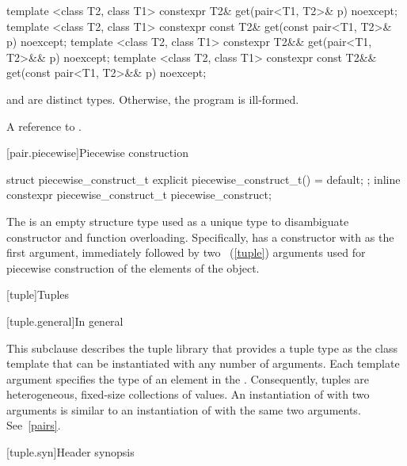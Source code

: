 %
\begin{itemdecl}
template <class T2, class T1>
  constexpr T2& get(pair<T1, T2>& p) noexcept;
template <class T2, class T1>
  constexpr const T2& get(const pair<T1, T2>& p) noexcept;
template <class T2, class T1>
  constexpr T2&& get(pair<T1, T2>&& p) noexcept;
template <class T2, class T1>
  constexpr const T2&& get(const pair<T1, T2>&& p) noexcept;
\end{itemdecl}
\begin{itemdescr}

\pnum
\requires {} and  are distinct types. Otherwise, the program is ill-formed.

\pnum
\returns A reference to .
\end{itemdescr}

[pair.piecewise]{Piecewise construction}

%
%
\begin{itemdecl}
struct piecewise_construct_t {
  explicit piecewise_construct_t() = default;
};
inline constexpr piecewise_construct_t piecewise_construct{};
\end{itemdecl}

\pnum
The   is an empty structure type
used as a unique type to disambiguate constructor and function overloading. Specifically,
 has a constructor with  as the
first argument, immediately followed by two ~(\ref{tuple}) arguments used
for piecewise construction of the elements of the  object.

[tuple]{Tuples}

[tuple.general]{In general}

\pnum
{}%
This subclause describes the tuple library that provides a tuple type as
the class template  that can be instantiated with any number
of arguments. Each template argument specifies
the type of an element in the .  Consequently, tuples are
heterogeneous, fixed-size collections of values. An instantiation of  with
two arguments is similar to an instantiation of  with the same two arguments.
See~\ref{pairs}.

[tuple.syn]{Header  synopsis}

